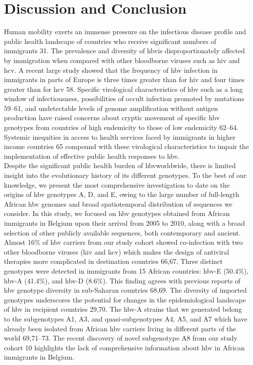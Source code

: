 \section{Discussion and Conclusion}
Human mobility exerts an immense pressure on the infectious disease profile and public health landscape of countries who receive significant numbers of immigrants 31. The prevalence and diversity of \gls{hbv}is disproportionately affected by immigration when compared with other bloodborne viruses such as \gls{hiv} and \gls{hcv}. A recent large study showed that the frequency of \gls{hbv} infection in immigrants in parts of Europe is three times greater than for \gls{hiv} and four times greater than for \gls{hcv} 58. Specific virological characteristics of \gls{hbv} such as a long window of infectiousness, possibilities of occult infection promoted by mutations 59–61, and undetectable levels of genome amplification without antigen production have raised concerns about cryptic movement of specific \gls{hbv} genotypes from countries of high endemicity to those of low endemicity 62–64. Systemic inequities in access to health services faced by immigrants in higher income countries 65 compound with these virological characteristics to impair the implementation of effective public health responses to \gls{hbv}.\\

Despite the significant public health burden of \gls{hbv}worldwide, there is limited insight into the evolutionary history of its different genotypes. To the best of our knowledge, we present the most comprehensive investigation to date on the origins of \gls{hbv} genotypes A, D, and E, owing to the large number of full-length African \gls{hbv} genomes and broad spatiotemporal distribution of sequences we consider. In this study, we focused on \gls{hbv} genotypes obtained  from African immigrants in Belgium upon their arrival from 2005 to 2010, along with  a broad selection of other publicly available sequences, both contemporary and ancient. Almost 16\% of \gls{hbv} carriers from our study cohort showed co-infection with two other bloodborne viruses (\gls{hiv} and \gls{hcv}) which makes the design of antiviral therapies more complicated in destination countries 66,67. Three distinct genotypes were detected in immigrants from 15 African countries: \gls{hbv}-E (50.4\%), \gls{hbv}-A (41.4\%), and \gls{hbv}-D (8.6\%). This finding agrees with previous reports of \gls{hbv} genotype diversity in sub-Saharan countries 68,69. The diversity of  imported genotypes underscores the potential for changes in the epidemiological landscape of \gls{hbv} in recipient countries 29,70. The \gls{hbv}-A strains that we generated belong to the subgenotypes A1, A3, and quasi-subgenotypes A4, A5, and A7 which have already been isolated from African \gls{hbv} carriers living in different parts of the world 69,71–73. The recent discovery of novel subgenotype A8 from our study cohort 10 highlights the lack of comprehensive information about \gls{hbv} in African immigrants in Belgium.\\

